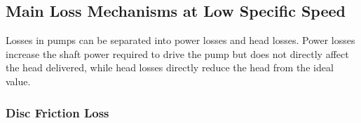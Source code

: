 





\subsection{Main Loss Mechanisms at Low Specific Speed}


Losses in pumps can be separated into power losses and head losses. Power losses increase the shaft power required to drive the pump but does not directly affect the head delivered, while head losses directly reduce the head from the ideal value.

\subsubsection{Disc Friction Loss}

